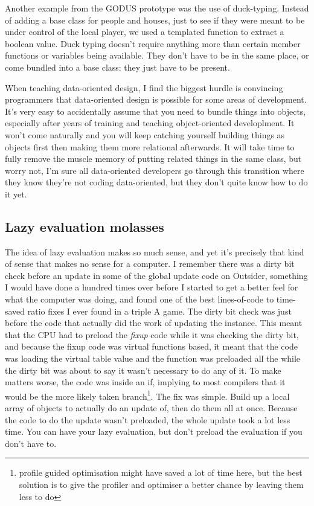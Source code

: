 Another example from the GODUS prototype was the use of duck-typing. Instead of
adding a base class for people and houses, just to see if they were meant to be
under control of the local player, we used a templated function to extract a
boolean value. Duck typing doesn't require anything more than certain member
functions or variables being available. They don't have to be in the same place, or come
bundled into a base class: they just have to be present.

When teaching data-oriented design, I find the biggest hurdle is convincing
programmers that data-oriented design is possible for some areas of
development.  It's very easy to accidentally assume that you need to bundle
things into objects, especially after years of training and teaching
object-oriented developlment. It won't come naturally and you will keep catching
yourself building things as objects first then making them more relational
afterwards.  It will take time to fully remove the muscle memory of putting
related things in the same class, but worry not, I'm sure all data-oriented
developers go through this transition where they know they're not coding
data-oriented, but they don't quite know how to do it yet.

\subsection{Lazy evaluation molasses}

The idea of lazy evaluation makes so much sense, and yet it's precisely that
kind of sense that makes no sense for a computer. I remember there was a dirty
bit check before an update in some of the global update code on Outsider,
something I would have done a hundred times over before I started to get a
better feel for what the computer was doing, and found one of the best
lines-of-code to time-saved ratio fixes I ever found in a triple A game.  The
dirty bit check was just before the code that actually did the work of updating
the instance. This meant that the CPU had to preload the \emph{fixup} code while
it was checking the dirty bit, and because the fixup code was virtual functions
based, it meant that the code was loading the virtual table value and the
function was preloaded all the while the dirty bit was about to say it wasn't
necessary to do any of it. To make matters worse, the code was inside an if,
implying to most compilers that it would be the more likely taken
branch\footnote{profile guided optimisation might have saved a lot of time
here, but the best solution is to give the profiler and optimiser a better
chance by leaving them less to do}. The fix was simple. Build up a local array
of objects to actually do an update of, then do them all at once. Because the
code to do the update wasn't preloaded, the whole update took a lot less time.
You can have your lazy evaluation, but don't preload the evaluation if you
don't have to.

